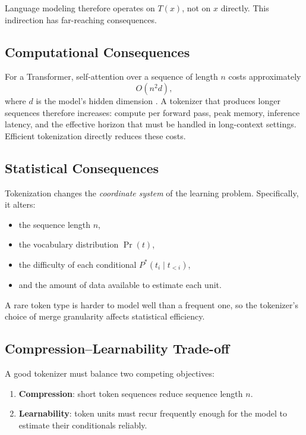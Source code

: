\documentclass[11pt,a4paper]{article}
\theoremstyle{definition}
\theoremstyle{plain}
\begin{document}
Language modeling therefore operates on $T(x)$, not on $x$ directly.
This indirection has far-reaching consequences.

\subsection{Computational Consequences}

For a Transformer, self-attention over a sequence of length $n$ costs approximately
\[
  O\!\left(n^2 d\right),
\]
where $d$ is the model's hidden dimension \cite{vaswani2017attention}.
A tokenizer that produces longer sequences therefore increases:
compute per forward pass, peak memory, inference latency, and
the effective horizon that must be handled in long-context settings.
Efficient tokenization directly reduces these costs.

\subsection{Statistical Consequences}

Tokenization changes the \emph{coordinate system} of the learning problem.
Specifically, it alters:
\begin{itemize}[leftmargin=2em, itemsep=2pt]
  \item the sequence length $n$,
  \item the vocabulary distribution $\Pr(t)$,
  \item the difficulty of each conditional $P^*(t_i \mid t_{<i})$,
  \item and the amount of data available to estimate each unit.
\end{itemize}

A rare token type is harder to model well than a frequent one,
so the tokenizer's choice of merge granularity affects statistical efficiency.

\subsection{Compression--Learnability Trade-off}

A good tokenizer must balance two competing objectives:

\begin{enumerate}[leftmargin=2em, itemsep=2pt]
  \item \textbf{Compression}: short token sequences reduce sequence length $n$.
  \item \textbf{Learnability}: token units must recur frequently enough for
        the model to estimate their conditionals reliably.
\end{enumerate}
\end{document}
